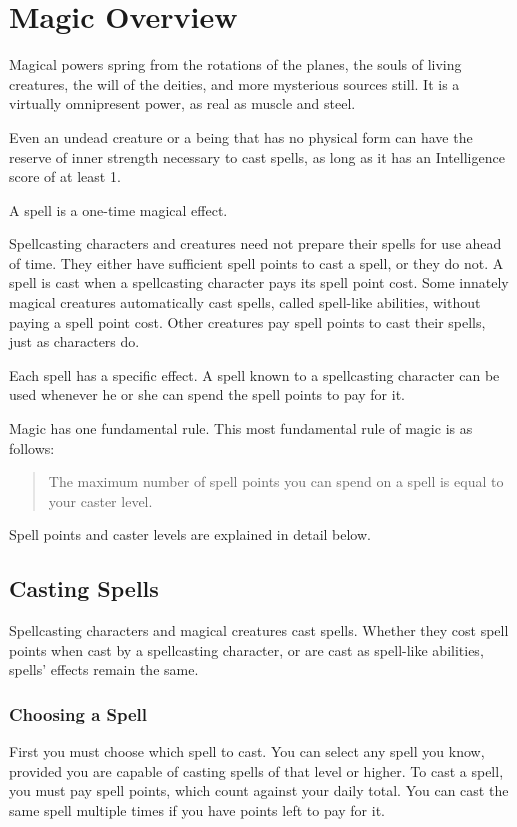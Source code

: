 
\section{Magic Overview}
\label{sec:MagicOverview}
Magical powers spring from the rotations of the planes, the souls of living creatures, the will of the deities,
and more mysterious sources still.
It is a virtually omnipresent power, as real as muscle and steel.

Even an undead creature or a being that has no physical form can have the reserve of inner strength necessary to cast spells, 
as long as it has an Intelligence score of at least 1. %

A spell is a one-time magical effect. 

Spellcasting characters and creatures need not prepare their spells for use ahead of time. 
They either have sufficient spell points to cast a spell, or they do not.
A spell is cast when a spellcasting character pays its spell point cost. 
Some innately magical creatures automatically cast spells, called spell-like abilities, without paying a spell point cost. 
Other creatures pay spell points to cast their spells, just as characters do.

Each spell has a specific effect. A spell known to a spellcasting character can be used whenever he or she can spend the spell points to pay for it.

Magic has one fundamental rule. This most fundamental rule of magic is as follows:
\begin{quote}
\Large{The maximum number of spell points you can spend on a spell is equal to your caster level.}
\end{quote}
Spell points and caster levels are explained in detail below.
\subsection{Casting Spells}
Spellcasting characters and magical creatures cast spells. 
Whether they cost spell points when cast by a spellcasting character, or are cast as spell-like abilities, spells' effects remain the same.
\subsubsection{Choosing a Spell}
First you must choose which spell to cast. 
You can select any spell you know, provided you are capable of casting spells of that level or higher. 
To cast a spell, you must pay spell points, which count against your daily total. 
You can cast the same spell multiple times if you have points left to pay for it.

